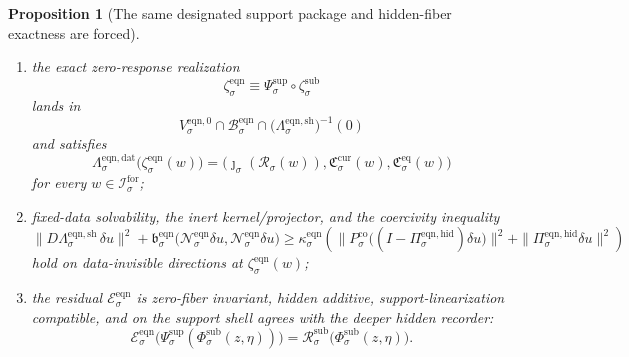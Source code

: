 \documentclass[11pt]{article}
\newcommand{\ForSpace}[1]{\mathcal I_{#1}^{\mathrm{for}}}
\newcommand{\Reduction}[1]{\mathcal R_{#1}}
\newcommand{\CurrentCarrier}[1]{\mathfrak C_{#1}^{\mathrm{cur}}}
\newcommand{\EqCarrier}[1]{\mathfrak C_{#1}^{\mathrm{eq}}}
\newcommand{\EqnBody}[1]{\mathcal B_{#1}^{\mathrm{eqn}}}
\newcommand{\EqnData}[1]{\Lambda_{#1}^{\mathrm{eqn,dat}}}
\newcommand{\EqnShell}[1]{\Lambda_{#1}^{\mathrm{eqn,sh}}}
\newcommand{\EqnPair}[1]{\mathfrak b_{#1}^{\mathrm{eqn}}}
\newcommand{\EqnResidual}[1]{\mathcal E_{#1}^{\mathrm{eqn}}}
\newcommand{\EqnZero}[1]{V_{#1}^{\mathrm{eqn},0}}
\newcommand{\EqnHidden}[1]{H_{#1}^{\mathrm{eqn}}}
\newcommand{\EqnProj}[1]{\Pi_{#1}^{\mathrm{eqn,hid}}}
\newcommand{\EqnLin}[1]{\mathcal N_{#1}^{\mathrm{eqn}}}
\newcommand{\EqnEmbed}[1]{\zeta_{#1}^{\mathrm{eqn}}}
\newcommand{\ShellChart}[1]{\Psi_{#1}^{\mathrm{sup}}}
\newcommand{\StateComp}[1]{P_{#1}^{\mathrm{co}}}
\newcommand{\SubSplit}[1]{\Phi_{#1}^{\mathrm{sub}}}
\newcommand{\SubResidual}[1]{\mathcal R_{#1}^{\mathrm{sub}}}
\newcommand{\SubEmbed}[1]{\zeta_{#1}^{\mathrm{sub}}}
\newtheorem{proposition}{Proposition}
\begin{document}
\begin{proposition}[The same designated support package and hidden-fiber exactness are forced]
\begin{enumerate}
\begin{equation}
    \ge
    \lambda_{\sigma}^{\mathrm{eqn}}\,
    \|\eta\|^{2}
    \qquad
    \text{for all }\eta\in\EqnHidden{\sigma};
    \label{eq:hidgap}
    \end{equation}
    \item the exact zero-response realization
    \[
    \EqnEmbed{\sigma}
    \equiv
    \ShellChart{\sigma}\circ\SubEmbed{\sigma}
    \]
    lands in
    \[
    \EqnZero{\sigma}\cap\EqnBody{\sigma}\cap\bigl(\EqnShell{\sigma}\bigr)^{-1}(0)
    \]
    and satisfies
    \begin{equation}
    \EqnData{\sigma}\bigl(\EqnEmbed{\sigma}(w)\bigr)
    =
    \bigl(
    \jmath_{\sigma}(\Reduction{\sigma}(w)),
    \CurrentCarrier{\sigma}(w),
    \EqCarrier{\sigma}(w)
    \bigr)
    \label{eq:eqncompat}
    \end{equation}
    for every \(w\in\ForSpace{\sigma}\);
    \item fixed-data solvability, the inert kernel/projector, and the coercivity inequality
    \begin{equation}
    \|D\EqnShell{\sigma}\,\delta u\|^{2}
    +
    \EqnPair{\sigma}\bigl(\EqnLin{\sigma}\delta u,\EqnLin{\sigma}\delta u\bigr)
    \ge
    \kappa_{\sigma}^{\mathrm{eqn}}
    \left(
    \|\StateComp{\sigma}\bigl((I-\EqnProj{\sigma})\delta u\bigr)\|^{2}
    +
    \|\EqnProj{\sigma}\delta u\|^{2}
    \right)
    \label{eq:eqncoercive}
    \end{equation}
    hold on data-invisible directions at \(\EqnEmbed{\sigma}(w)\);
    \item the residual \(\EqnResidual{\sigma}\) is zero-fiber invariant, hidden additive, support-linearization compatible, and on the support shell agrees with the deeper hidden recorder:
    \begin{equation}
    \EqnResidual{\sigma}\bigl(\ShellChart{\sigma}(\SubSplit{\sigma}(z,\eta))\bigr)
    =
    \SubResidual{\sigma}\bigl(\SubSplit{\sigma}(z,\eta)\bigr).
    \label{eq:residualagreement}
    \end{equation}
\end{enumerate}
\end{proposition}
\end{document}
